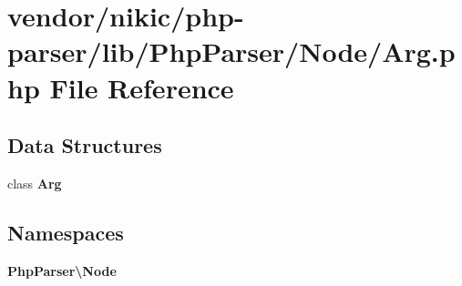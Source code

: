 \section{vendor/nikic/php-\/parser/lib/\+Php\+Parser/\+Node/\+Arg.php File Reference}
\label{_arg_8php}
\subsection*{Data Structures}
\begin{DoxyCompactItemize}
\item 
class {\bf Arg}
\end{DoxyCompactItemize}
\subsection*{Namespaces}
\begin{DoxyCompactItemize}
\item 
 {\bf Php\+Parser\textbackslash{}\+Node}
\end{DoxyCompactItemize}
